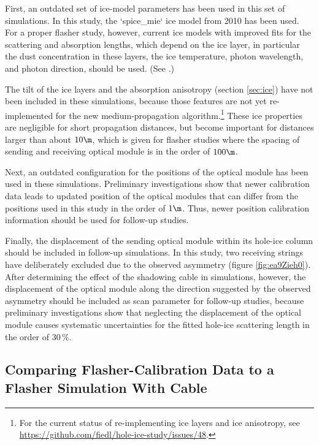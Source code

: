 First, an outdated set of ice-model parameters has been used in this set of simulations. In this study, the `spice_mie` ice model from 2010 has been used. For a proper flasher study, however, current ice models with improved fits for the scattering and absorption lengths, which depend on the ice layer, in particular the dust concentration in these layers, the ice temperature, photon wavelength, and photon direction, should be used. (See \cite{icepaper,flasherdataderivedicemodels}.)

The tilt of the ice layers and the absorption anisotropy (section \ref{sec:ice}) have not been included in these simulations, because those features are not yet re-implemented for the new medium-propagation algorithm.\footnote{For the current status of re-implementing ice layers and ice anisotropy, see \url{https://github.com/fiedl/hole-ice-study/issues/48}.} These ice properties are negligible for short propagation distances, but become important for distances larger than about $10\m$, which is given for flasher studies where the spacing of sending and receiving optical module is in the order of $100\m$.

Next, an outdated configuration for the positions of the optical module has been used in these simulations. Preliminary investigations show that newer calibration data leads to updated position of the optical modules that can differ from the positions used in this study in the order of $1\m$. Thus, newer position calibration information should be used for follow-up studies.

Finally, the displacement of the sending optical module within its hole-ice column should be included in follow-up simulations. In this study, two receiving strings have deliberately excluded due to the observed asymmetry (figure \ref{fig:ea9Zieh0}). After determining the effect of the shadowing cable in simulations, however, the displacement of the optical module along the direction suggested by the observed asymmetry should be included as scan parameter for follow-up studies, because preliminary investigations show that neglecting the displacement of the optical module causes systematic uncertainties for the fitted hole-ice scattering length in the order of $30\,\%$.


\subsection{Comparing Flasher-Calibration Data to a Flasher Simulation With Cable}
\label{sec:flasher_with_cable}

